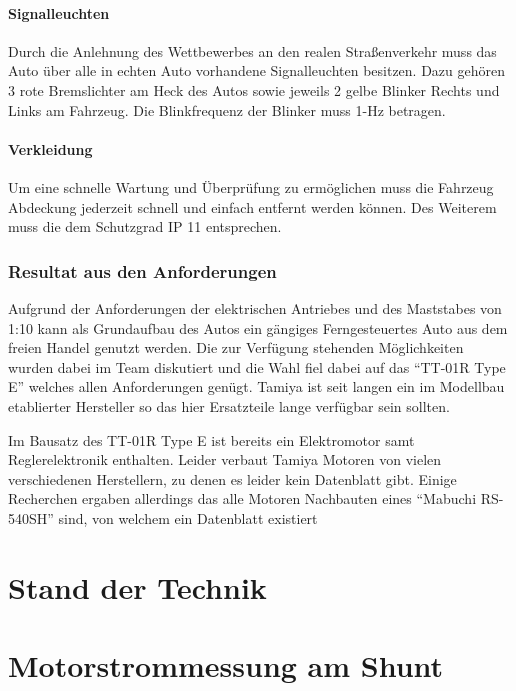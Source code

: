 \documentclass[11pt,twoside,a4paper,openright]{mpreport}
\begin{document}
\subsubsection{Signalleuchten}
Durch die Anlehnung des Wettbewerbes an den realen Straßenverkehr muss das Auto über alle in echten Auto vorhandene Signalleuchten besitzen. 
Dazu gehören 3 rote Bremslichter am Heck des Autos sowie jeweils 2 gelbe Blinker Rechts und Links am Fahrzeug.  Die Blinkfrequenz der Blinker muss
1-Hz betragen.

\subsubsection{Verkleidung}
Um eine schnelle Wartung und Überprüfung zu ermöglichen muss die Fahrzeug Abdeckung jederzeit schnell und einfach entfernt werden können. Des Weiterem muss die dem 
Schutzgrad IP 11 entsprechen.


\subsection{Resultat aus den Anforderungen}
Aufgrund der Anforderungen der elektrischen Antriebes und des Maststabes von 1:10 kann als Grundaufbau des Autos ein gängiges Ferngesteuertes Auto aus dem
freien Handel genutzt werden. Die zur Verfügung stehenden Möglichkeiten wurden dabei im Team diskutiert und die Wahl fiel dabei auf das ``TT-01R Type E'' welches
allen Anforderungen genügt. Tamiya ist seit langen ein im Modellbau etablierter Hersteller so das hier Ersatzteile lange verfügbar sein sollten.

Im Bausatz des TT-01R Type E ist bereits ein Elektromotor samt Reglerelektronik enthalten. Leider verbaut Tamiya Motoren von vielen verschiedenen Herstellern,
zu denen es leider kein Datenblatt gibt. Einige Recherchen ergaben allerdings das alle Motoren Nachbauten eines ``Mabuchi RS-540SH'' sind, von welchem ein Datenblatt
existiert \cite{Mabuchi}








\chapter{Stand der Technik}

\chapter{Motorstrommessung am Shunt}
\end{document}

